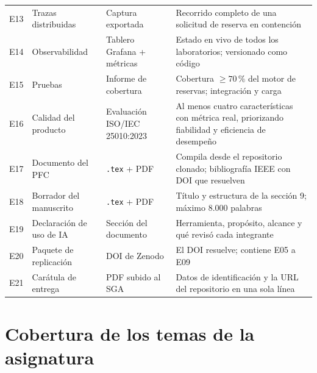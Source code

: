 \documentclass[11pt,a4paper]{article}
\begin{document}
\begin{center}
\begin{longtable}{@{}p{0.9cm}p{4.6cm}p{4.2cm}p{5.0cm}@{}}
		E13 & Trazas distribuidas & Captura exportada & Recorrido completo de una solicitud de reserva en contención \\
		E14 & Observabilidad & Tablero Grafana + métricas & Estado en vivo de todos los laboratorios; versionado como código \\
		E15 & Pruebas & Informe de cobertura & Cobertura $\geq 70\,\%$ del motor de reservas; integración y carga \\
		E16 & Calidad del producto & Evaluación ISO/IEC 25010:2023 & Al menos cuatro características con métrica real, priorizando fiabilidad y eficiencia de desempeño \cite{iso25010_2023} \\
		E17 & Documento del PFC & \texttt{.tex} + PDF & Compila desde el repositorio clonado; bibliografía IEEE con DOI que resuelven \\
		E18 & Borrador del manuscrito & \texttt{.tex} + PDF & Título y estructura de la sección 9; máximo 8.000 palabras \\
		E19 & Declaración de uso de IA & Sección del documento & Herramienta, propósito, alcance y qué revisó cada integrante \\
		E20 & Paquete de replicación & DOI de Zenodo & El DOI resuelve; contiene E05 a E09 \\
		E21 & Carátula de entrega & PDF subido al SGA & Datos de identificación y la URL del repositorio en una sola línea \\
		\bottomrule
	\end{longtable}
\end{center}

\section{Cobertura de los temas de la asignatura}
\end{document}
